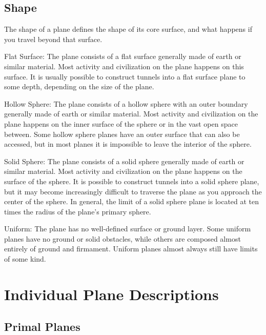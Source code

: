   \subsection{Shape} The shape of a plane defines the shape of its core surface, and what happens if you travel beyond that surface.

    \begin{raggeditemize}
      \item Flat Surface: The plane consists of a flat surface generally made of earth or similar material.
        Most activity and civilization on the plane happens on this surface.
        It is usually possible to construct tunnels into a flat surface plane to some depth, depending on the size of the plane.
      \item Hollow Sphere: The plane consists of a hollow sphere with an outer boundary generally made of earth or similar material.
        Most activity and civilization on the plane happens on the inner surface of the sphere or in the vast open space between.
        Some hollow sphere planes have an outer surface that can also be accessed, but in most planes it is impossible to leave the interior of the sphere.
      \item Solid Sphere: The plane consists of a solid sphere generally made of earth or similar material.
        Most activity and civilization on the plane happens on the surface of the sphere.
        It is possible to construct tunnels into a solid sphere plane, but it may become increasingly difficult to traverse the plane as you approach the center of the sphere.
        In general, the limit of a solid sphere plane is located at ten times the radius of the plane's primary sphere.
      \item Uniform: The plane has no well-defined surface or ground layer.
        Some uniform planes have no ground or solid obstacles, while others are composed almost entirely of ground and firmament.
        Uniform planes almost always still have limits of some kind.
    \end{raggeditemize}

\section{Individual Plane Descriptions}

  \subsection{Primal Planes}

